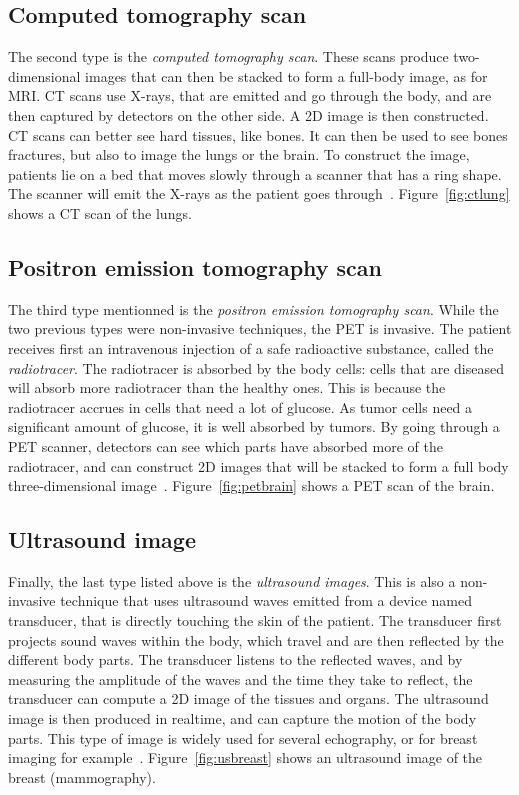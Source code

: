 \subsection{Computed tomography scan}
The second type is the \emph{computed tomography scan}. These scans produce two-dimensional images that can then be stacked to form a full-body image, as for MRI. CT scans use X-rays, that are emitted and go through the body, and are then captured by detectors on the other side. A 2D image is then constructed. CT scans can better see hard tissues, like bones. It can then be used to see bones fractures, but also to image the lungs or the brain. To construct the image, patients lie on a bed that moves slowly through a scanner that has a ring shape. The scanner will emit the X-rays as the patient goes through~\cite{national_institute_of_biomedical_imaging_and_bioengineering_computed_nodate}. Figure~\ref{fig:ctlung} shows a CT scan of the lungs.

\subsection{Positron emission tomography scan}
The third type mentionned is the \emph{positron emission tomography scan}. While the two previous types were non-invasive techniques, the PET is invasive. The patient receives first an intravenous injection of a safe radioactive substance, called the \emph{radiotracer}. The radiotracer is absorbed by the body cells: cells that are diseased will absorb more radiotracer than the healthy ones. This is because the radiotracer accrues in cells that need a lot of glucose. As tumor cells need a significant amount of glucose, it is well absorbed by tumors. By going through a PET scanner, detectors can see which parts have absorbed more of the radiotracer, and can construct 2D images that will be stacked to form a full body three-dimensional image~\cite{cleveland_clinic_pet_nodate}. Figure~\ref{fig:petbrain} shows a PET scan of the brain.

\subsection{Ultrasound image}
Finally, the last type listed above is the \emph{ultrasound images}. This is also a non-invasive technique that uses ultrasound waves emitted from a device named transducer, that is directly touching the skin of the patient. The transducer first projects sound waves within the body, which travel and are then reflected by the different body parts. The transducer listens to the reflected waves, and by measuring the amplitude of the waves and the time they take to reflect, the transducer can compute a 2D image of the tissues and organs. The ultrasound image is then produced in realtime, and can capture the motion of the body parts. This type of image is widely used for several echography, or for breast imaging for example~\cite{national_institute_of_biomedical_imaging_and_bioengineering_ultrasound_nodate}. Figure~\ref{fig:usbreast} shows an ultrasound image of the breast (mammography).

